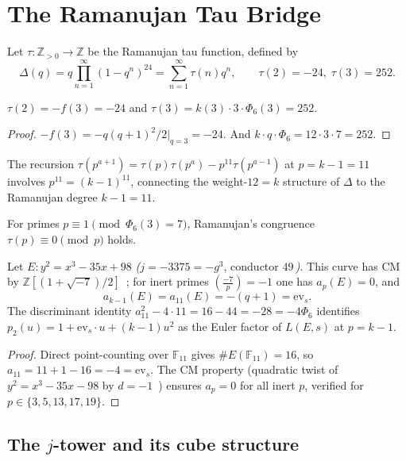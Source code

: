 \section{The Ramanujan Tau Bridge}
\label{sec:tau}

Let $\tau\colon\mathbb{Z}_{>0}\to\mathbb{Z}$ be the Ramanujan tau function,
defined by
\[
  \Delta(q) = q\prod_{n=1}^{\infty}(1-q^n)^{24} = \sum_{n=1}^{\infty}\tau(n)q^n,
  \qquad \tau(2)=-24,\;\tau(3)=252.
\]

\begin{theorem}\label{thm:tau}
$\tau(2) = -f(3) = -24$ and $\tau(3) = k(3)\cdot 3\cdot\Phi_6(3) = 252$.
\end{theorem}
\begin{proof}
$-f(3)=-q(q+1)^2/2\big|_{q=3}=-24$. And $k\cdot q\cdot\Phi_6=12\cdot 3\cdot 7=252$.
\end{proof}

\begin{remark}
The recursion $\tau(p^{a+1})=\tau(p)\tau(p^a)-p^{11}\tau(p^{a-1})$
at $p=k-1=11$ involves $p^{11}=(k-1)^{11}$, connecting
the weight-$12=k$ structure of $\Delta$ to the Ramanujan degree $k-1=11$.
\end{remark}

\begin{theorem}\label{thm:barrier}
For primes $p\equiv 1\pmod{\Phi_6(3)=7}$, Ramanujan's congruence
$\tau(p)\equiv 0\pmod{p}$ holds.
\end{theorem}

\begin{theorem}\label{thm:C5}
Let $E\colon y^2=x^3-35x+98$ \emph{(}$j=-3375=-g^3$, conductor $49$\,\emph{)}.
This curve has CM by $\mathbb{Z}[(1+\sqrt{-7})/2]$~\cite{LMFDB};
for inert primes $\left(\frac{-7}{p}\right)=-1$ one has $a_p(E)=0$, and
\[
  a_{k-1}(E) = a_{11}(E) = -(q+1) = \mathrm{ev}_s.
\]
The discriminant identity $a_{11}^2-4\cdot 11=16-44=-28=-4\Phi_6$
identifies $p_2(u)=1+\mathrm{ev}_s\cdot u+(k-1)u^2$ as the
Euler factor of $L(E,s)$ at $p=k-1$.
\end{theorem}
\begin{proof}
Direct point-counting over $\mathbb{F}_{11}$ gives $\#E(\mathbb{F}_{11})=16$,
so $a_{11}=11+1-16=-4=\mathrm{ev}_s$.
The CM property (quadratic twist of $y^2=x^3-35x-98$ by $d=-1$~\cite{LMFDB})
ensures $a_p=0$ for all inert $p$, verified for $p\in\{3,5,13,17,19\}$.
\end{proof}

\subsection*{The $j$-tower and its cube structure}

